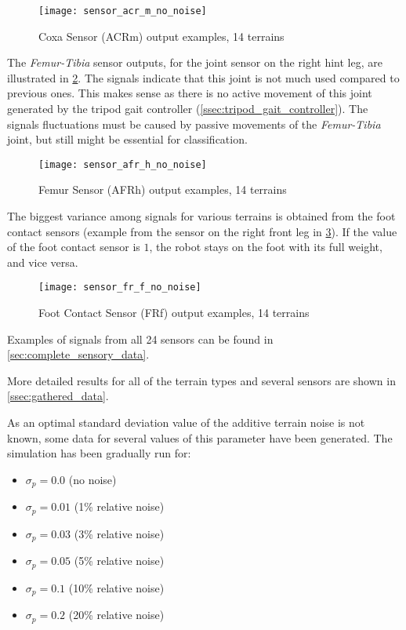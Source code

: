 \begin{figure}[H]
  \centering
  \texttt{[image: sensor\_acr\_m\_no\_noise]}
  \caption{Coxa Sensor (ACRm) output examples, 14 terrains}
  \label{fig:sensor_acr_m_no_noise}
\end{figure}

The \textit{Femur-Tibia} sensor outputs, for the joint sensor on the right hint leg, are illustrated in \ref{fig:sensor_afr_h_no_noise}. The signals indicate that this joint is not much used compared to previous ones. This makes sense as there is no active movement of this joint generated by the tripod gait controller (\cref{ssec:tripod_gait_controller}). The signals fluctuations must be caused by passive movements of the \textit{Femur-Tibia} joint, but still might be essential for classification.

\begin{figure}[H]
  \centering
  \texttt{[image: sensor\_afr\_h\_no\_noise]}
  \caption{Femur Sensor (AFRh) output examples, 14 terrains}
  \label{fig:sensor_afr_h_no_noise}
\end{figure}

The biggest variance among signals for various terrains is obtained from the foot contact sensors (example from the sensor on the right front leg in \cref{fig:sensor_fr_f_no_noise}). If the value of the foot contact sensor is $ 1 $, the robot stays on the foot with its full weight, and vice versa.

\begin{figure}[H]
  \centering
  \texttt{[image: sensor\_fr\_f\_no\_noise]}
  \caption{Foot Contact Sensor (FRf) output examples, 14 terrains}
  \label{fig:sensor_fr_f_no_noise}
\end{figure}

Examples of signals from all 24 sensors can be found in \cref{sec:complete_sensory_data}.

More detailed results for all of the terrain types and several sensors are shown in \cref{ssec:gathered_data}. 

As an optimal standard deviation value of the additive terrain noise is not known, some data for several values of this parameter have been generated. The simulation has been gradually run for:

\begin{itemize}
\item $ \sigma_p = 0.0 $ (no noise)
\item $ \sigma_p = 0.01 $ (1\% relative noise)
\item $ \sigma_p = 0.03 $ (3\% relative noise)
\item $ \sigma_p = 0.05 $ (5\% relative noise)
\item $ \sigma_p = 0.1 $ (10\% relative noise)
\item $ \sigma_p = 0.2 $ (20\% relative noise)
\end{itemize}

